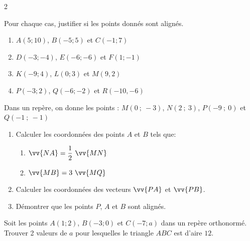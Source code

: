 \documentclass[main.tex]{subfiles}
\begin{document}
\begin{multicols}{2}
\begin{exercise} 
Pour chaque cas, justifier si les points donnés sont alignés.
\begin{enumerate}[label=\alph*)]
\item $A(5;10)$, $B(-5;5)$ et $C(-1;7)$
\item $D(-3;-4)$, $E(-6;-6)$ et $F(1;-1)$
\item $K(-9;4)$, $L(0;3)$ et $M(9,2)$
\item $P(-3;2)$, $Q(-6;-2)$ et $R(-10,-6)$
\end{enumerate}  
\end{exercise}
\begin{exercise}  
Dans un repère, on donne les points : $M(0~;~-3)$, $N(2~;~3)$, $P(-9~;~0)$ et $Q(-1~;~-1)$
\begin{enumerate}[label=\arabic*),leftmargin=*]
\item Calculer les coordonnées des points $A$ et $B$ tels que: 
\begin{enumerate}[label=\alph*),leftmargin=*]
\item $\vv{NA}=\dfrac{1}{2}~\vv{MN}$
\item $\vv{MB}=3~\vv{MQ}$
\end{enumerate}
\item Calculer les coordonnées des vecteurs $\vv{PA}$ et $\vv{PB}$.
\item Démontrer que les points $P$, $A$ et $B$ sont alignés.
\end{enumerate}
\end{exercise}
\begin{exercise} 
Soit les points  $A(1 ; 2)$, $B(-3 ; 0)$ et $C(-7 ; a)$ dans un repère orthonormé. Trouver 2 valeurs de $a$ pour lesquelles le triangle $ABC$ est d'aire $12$.  
\end{exercise}
\end{multicols}
\end{document}
